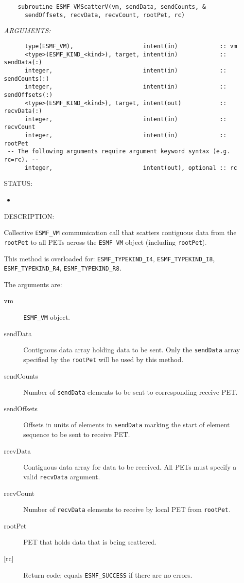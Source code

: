   
\begin{verbatim}    subroutine ESMF_VMScatterV(vm, sendData, sendCounts, &
      sendOffsets, recvData, recvCount, rootPet, rc)\end{verbatim}{\em ARGUMENTS:}
\begin{verbatim}      type(ESMF_VM),                    intent(in)            :: vm
      <type>(ESMF_KIND_<kind>), target, intent(in)            :: sendData(:)
      integer,                          intent(in)            :: sendCounts(:)
      integer,                          intent(in)            :: sendOffsets(:)
      <type>(ESMF_KIND_<kind>), target, intent(out)           :: recvData(:)
      integer,                          intent(in)            :: recvCount
      integer,                          intent(in)            :: rootPet
 -- The following arguments require argument keyword syntax (e.g. rc=rc). --
      integer,                          intent(out), optional :: rc\end{verbatim}
{\sf STATUS:}
   \begin{itemize}
   \item{}
   \end{itemize}
  
{\sf DESCRIPTION:\\ }


     Collective {\tt ESMF\_VM} communication call that scatters contiguous data 
     from the {\tt rootPet} to all PETs across the {\tt ESMF\_VM} object
     (including {\tt rootPet}).
  
     This method is overloaded for:
     {\tt ESMF\_TYPEKIND\_I4}, {\tt ESMF\_TYPEKIND\_I8},
     {\tt ESMF\_TYPEKIND\_R4}, {\tt ESMF\_TYPEKIND\_R8}.
  
     The arguments are:
     \begin{description}
     \item[vm] 
          {\tt ESMF\_VM} object.
     \item[sendData]
          Contiguous data array holding data to be sent. Only the {\tt sendData}
          array specified by the {\tt rootPet} will be used by this method.
     \item[sendCounts] 
          Number of {\tt sendData} elements to be sent to corresponding
          receive PET.
     \item[sendOffsets] 
          Offsets in units of elements in {\tt sendData} marking the start of
          element sequence to be sent to receive PET.
     \item[recvData] 
          Contiguous data array for data to be received. All PETs must specify a
          valid {\tt recvData} argument.
     \item[recvCount] 
          Number of {\tt recvData} elements to receive by local PET from
          {\tt rootPet}.
     \item[rootPet]
          PET that holds data that is being scattered.
     \item[{[rc]}] 
          Return code; equals {\tt ESMF\_SUCCESS} if there are no errors.
     \end{description}
   
